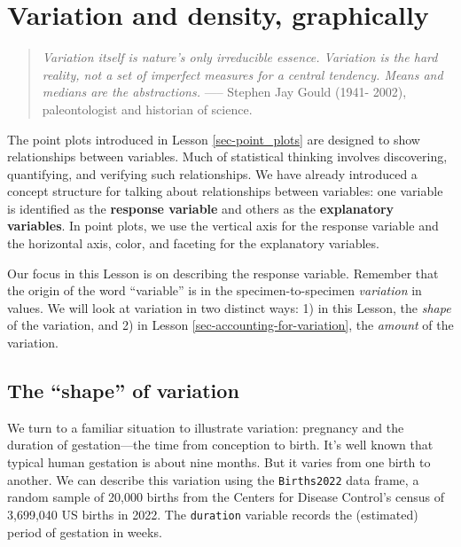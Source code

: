\documentclass[
  letterpaper,
  DIV=11,
  numbers=noendperiod,
  oneside]{scrartcl}
\begin{document}
\newpage

\section{Variation and density,
graphically}\label{sec-variation-and-distribution}

\begin{quote}
\emph{Variation itself is nature's only irreducible essence. Variation
is the hard reality, not a set of imperfect measures for a central
tendency. Means and medians are the abstractions.} ----- Stephen Jay
Gould (1941- 2002), paleontologist and historian of science.
\end{quote}

The point plots introduced in Lesson \ref{sec-point_plots} are designed
to show relationships between variables. Much of statistical thinking
involves discovering, quantifying, and verifying such relationships. We
have already introduced a concept structure for talking about
relationships between variables: one variable is identified as the
\textbf{response variable} and others as the \textbf{explanatory
variables}. In point plots, we use the vertical axis for the response
variable and the horizontal axis, color, and faceting for the
explanatory variables.

Our focus in this Lesson is on describing the response variable.
Remember that the origin of the word ``variable''
{} is in the
specimen-to-specimen \emph{variation} in values. We will look at
variation in two distinct ways: 1) in this Lesson, the \emph{shape} of
the variation, and 2) in Lesson \ref{sec-accounting-for-variation}, the
\emph{amount} of the variation.

\subsection{The ``shape'' of variation}\label{the-shape-of-variation}

We turn to a familiar situation to illustrate variation: pregnancy and
the duration of gestation---the time from conception to birth. It's well
known that typical human gestation is about nine months. But it varies
from one birth to another. We can describe this variation using the
\texttt{Births2022} data frame, a random sample of 20,000 births from
the Centers for Disease Control's census of 3,699,040 US births in 2022.
The \texttt{duration} variable records the (estimated) period of
gestation in weeks.
\end{document}
